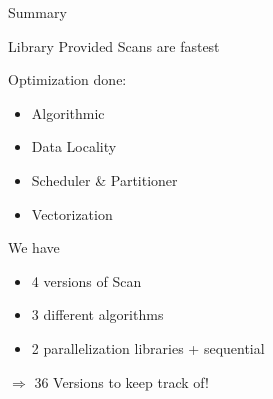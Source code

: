 \begin{frame}{Summary} 
\begin{center}
 Library Provided Scans are fastest\\
\end{center}
 
\pause
\vspace{5pt}
Optimization done:
\begin{itemize}
 \item Algorithmic
 \item Data Locality
 \item Scheduler \& Partitioner
 \item Vectorization
\end{itemize}
We have
\begin{itemize}
 \item 4 versions of Scan
 \item 3 different algorithms
 \item 2 parallelization libraries + sequential
\end{itemize}
\begin{center}
$\Rightarrow$ 36 Versions to keep track of! 
\end{center}

\end{frame} 
